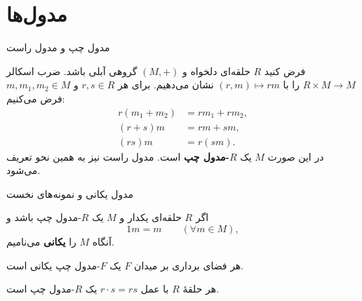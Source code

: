 \section{مدول‌ها}

\begin{frame}{مدول چپ و مدول راست}
    \label{lec04:module-definition}
    \begin{definition}[مدول چپ]
        فرض کنید $R$ حلقه‌ای دلخواه و $(M,+)$ گروهی آبلی باشد.
        ضرب اسکالر $R\times M\to M$ را با $(r,m)\mapsto rm$ نشان می‌دهیم.
        برای هر $r,s\in R$ و $m,m_1,m_2\in M$ فرض می‌کنیم:
        \[
        \begin{aligned}
            r(m_1+m_2)&=rm_1+rm_2,\\
            (r+s)m&=rm+sm,\\
            (rs)m&=r(sm).
        \end{aligned}
        \]
        در این صورت $M$ یک \textbf{$R$-مدول چپ} است.
        مدول راست نیز به همین نحو تعریف می‌شود.
    \end{definition}
\end{frame}

\begin{frame}{مدول یکانی و نمونه‌های نخست}
    \label{lec04:unitary-module}
    \begin{definition}
        اگر $R$ حلقه‌ای یکدار و $M$ یک $R$-مدول چپ باشد و
        \[
            1m=m\qquad(\forall m\in M),
        \]
        آنگاه $M$ را \textbf{یکانی} می‌نامیم.
    \end{definition}
    \begin{example}
        هر فضای برداری بر میدان $F$ یک $F$-مدول چپ یکانی است.
    \end{example}
    \begin{example}
        هر حلقهٔ $R$ با عمل $r\cdot s=rs$ یک $R$-مدول چپ است.
    \end{example}
\end{frame}

